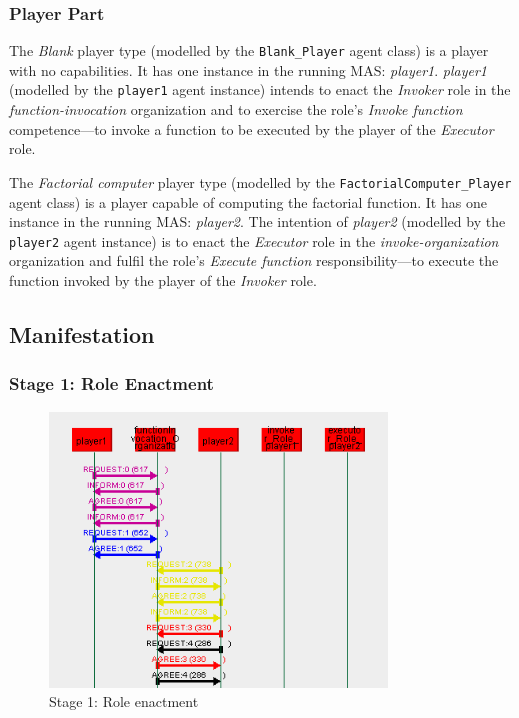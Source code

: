 \subsubsection*{Player Part}

The \textit{Blank} player type (modelled by the \texttt{Blank\_Player} agent class) is a player with no capabilities.
It has one instance in the running MAS: \textit{player1}.
\textit{player1} (modelled by the \texttt{player1} agent instance) intends to enact the \textit{Invoker} role in the \textit{function-invocation} organization and to exercise the role's \textit{Invoke function} competence---to invoke a function to be executed by the player of the \textit{Executor} role.

The \textit{Factorial computer} player type (modelled by the \texttt{FactorialComputer\_Player} agent class) is a player capable of computing the factorial function.
It has one instance in the running MAS: \textit{player2}.
The intention of \textit{player2} (modelled by the \texttt{player2} agent instance) is to enact the \textit{Executor} role in the \textit{invoke-organization} organization and fulfil the role's \textit{Execute function} responsibility---to execute the function invoked by the player of the \textit{Invoker} role.

\subsection*{Manifestation}

\subsubsection*{Stage 1: Role Enactment}

\begin{figure}[H]
	\centering
	\includegraphics[width=0.8\textwidth]{images/examples/example1-stage1.png}
	\caption{Stage 1: Role enactment}
	\label{figure:example1-stage1}
\end{figure}

